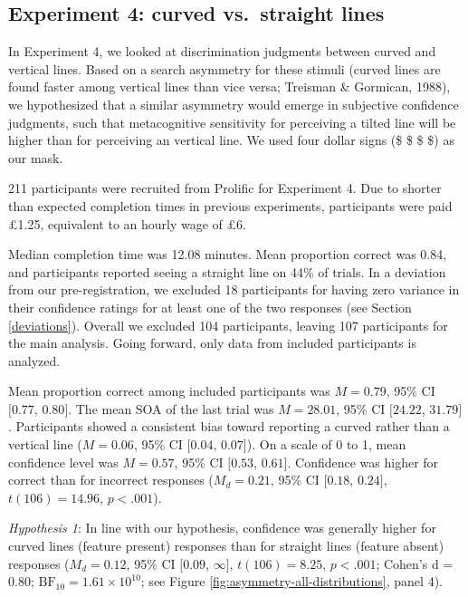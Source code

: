 \documentclass[12pt,twoside]{reedthesis}
\begin{document}
\hypertarget{experiment-4-curved-vs.-straight-lines}{%
\subsection{Experiment 4: curved vs.~straight lines}\label{experiment-4-curved-vs.-straight-lines}}

In Experiment 4, we looked at discrimination judgments between curved and vertical lines. Based on a search asymmetry for these stimuli (curved lines are found faster among vertical lines than vice versa; Treisman \& Gormican, 1988), we hypothesized that a similar asymmetry would emerge in subjective confidence judgments, such that metacognitive sensitivity for perceiving a tilted line will be higher than for perceiving an vertical line. We used four dollar signs (\$ \$ \$ \$) as our mask.

211 participants were recruited from Prolific for Experiment 4. Due to shorter than expected completion times in previous experiments, participants were paid £1.25, equivalent to an hourly wage of £6.

Median completion time was 12.08 minutes. Mean proportion correct was 0.84, and participants reported seeing a straight line on 44\% of trials. In a deviation from our pre-registration, we excluded 18 participants for having zero variance in their confidence ratings for at least one of the two responses (see Section \ref{deviations}). Overall we excluded 104 participants, leaving 107 participants for the main analysis. Going forward, only data from included participants is analyzed.

Mean proportion correct among included participants was \(M = 0.79\), 95\% CI \([0.77\), \(0.80]\). The mean SOA of the last trial was \(M = 28.01\), 95\% CI \([24.22\), \(31.79]\). Participants showed a consistent bias toward reporting a curved rather than a vertical line (\(M = 0.06\), 95\% CI \([0.04\), \(0.07]\)). On a scale of 0 to 1, mean confidence level was \(M = 0.57\), 95\% CI \([0.53\), \(0.61]\). Confidence was higher for correct than for incorrect responses (\(M_d = 0.21\), 95\% CI \([0.18\), \(0.24]\), \(t(106) = 14.96\), \(p < .001\)).

\emph{Hypothesis 1}: In line with our hypothesis, confidence was generally higher for curved lines (feature present) responses than for straight lines (feature absent) responses (\(M_d = 0.12\), 95\% CI \([0.09\), \(\infty]\), \(t(106) = 8.25\), \(p < .001\); Cohen's d = 0.80; \(\mathrm{BF}_{\textrm{10}} = 1.61 \times 10^{10}\); see Figure \ref{fig:asymmetry-all-distributions}, panel 4).
\end{document}
